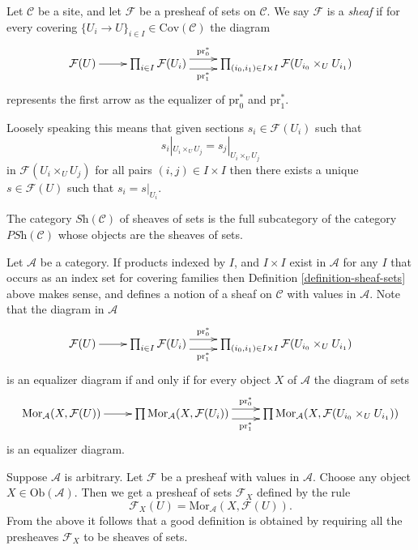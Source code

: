 \begin{definition}
\label{definition-sheaf-sets}
Let $\mathcal{C}$ be a site, and let $\mathcal{F}$ be a presheaf of sets
on $\mathcal{C}$. We say $\mathcal{F}$ is a {\it sheaf} if
for every covering $\{U_i \to U\}_{i \in I} \in \text{Cov}(\mathcal{C})$ 
the diagram
$$
\xymatrix{
\mathcal{F}(U) \ar[r]
&
\prod\nolimits_{i\in I}
\mathcal{F}(U_i)
\ar@<1ex>[r]^-{\text{pr}_0^*} \ar@<-1ex>[r]_-{\text{pr}_1^*}
&
\prod\nolimits_{(i_0, i_1) \in I\times I}
\mathcal{F}(U_{i_0}\times_U U_{i_1})
}
$$
represents the first arrow as the equalizer of $\text{pr}_0^*$
and $\text{pr}_1^*$.
\end{definition}

\noindent
Loosely speaking this means that given sections $s_i \in \mathcal{F}(U_i)$
such that
$$
s_i|_{U_i \times_U U_j} = s_j|_{U_i \times_U U_j}
$$
in $\mathcal{F}(U_i \times_U U_j)$ for all pairs $(i,j) \in I\times I$
then there exists a unique $s \in \mathcal{F}(U)$ such
that $s_i = s|_{U_i}$.

\begin{definition}
\label{definition-category-sheaves-sets}
The category $\textit{Sh}(\mathcal{C})$
of sheaves of sets is the full subcategory of the category
$\textit{PSh}(\mathcal{C})$ whose objects are the sheaves of sets.
\end{definition}

\medskip\noindent
Let $\mathcal{A}$ be a category. If products indexed by $I$, and
$I\times I$ exist in $\mathcal{A}$ for any $I$ that occurs as an index
set for covering families then Definition \ref{definition-sheaf-sets}
above makes sense, and defines a notion of a sheaf on $\mathcal{C}$
with values in $\mathcal{A}$. Note that the diagram in $\mathcal{A}$
$$
\xymatrix{
\mathcal{F}(U) \ar[r]
&
\prod\nolimits_{i\in I}
\mathcal{F}(U_i)
\ar@<1ex>[r]^-{\text{pr}_0^*} \ar@<-1ex>[r]_-{\text{pr}_1^*}
&
\prod\nolimits_{(i_0, i_1) \in I\times I}
\mathcal{F}(U_{i_0}\times_U U_{i_1})
}
$$
is an equalizer diagram if and only if for every object $X$ of
$\mathcal{A}$ the diagram of sets
$$
\xymatrix{
\text{Mor}_{\mathcal{A}}(X, \mathcal{F}(U)) \ar[r]
&
\prod
\text{Mor}_{\mathcal{A}}(X, \mathcal{F}(U_i))
\ar@<1ex>[r]^-{\text{pr}_0^*} \ar@<-1ex>[r]_-{\text{pr}_1^*}
&
\prod
\text{Mor}_{\mathcal{A}}(X, \mathcal{F}(U_{i_0}\times_U U_{i_1}))
}
$$
is an equalizer diagram.

\medskip\noindent
Suppose $\mathcal{A}$ is arbitrary.
Let $\mathcal{F}$ be a presheaf with values in $\mathcal{A}$.
Choose any object $X\in \text{Ob}(\mathcal{A})$.
Then we get a presheaf of sets $\mathcal{F}_X$ defined
by the rule
$$
\mathcal{F}_X(U) = \text{Mor}_{\mathcal{A}}(X, \mathcal{F}(U)).
$$
From the above it follows that a good definition is
obtained by requiring all the presheaves $\mathcal{F}_X$ to be
sheaves of sets.

